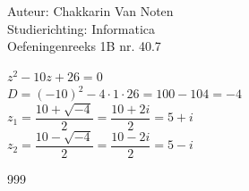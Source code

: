 \documentclass[a4paper]{article}
\begin{document}
  
\noindent \large Auteur: Chakkarin Van Noten \\
\noindent \large Studierichting: Informatica\\
\noindent \large Oefeningenreeks 1B nr. 40.7\\

\medskip

\normalsize

$z^{2} - 10z + 26 = 0$\\

$D = (-10)^{2} - 4 \cdot 1 \cdot 26 = 100 - 104 = -4$\\

$z_1 = \dfrac{10 + \sqrt{-4}}{2} = \dfrac{10 + 2i}{2} = 5 + i$\\

$z_2 = \dfrac{10 - \sqrt{-4}}{2} = \dfrac{10 - 2i}{2} = 5 - i$\\

\begin{thebibliography}{999}
\end{thebibliography}
\end{document}
